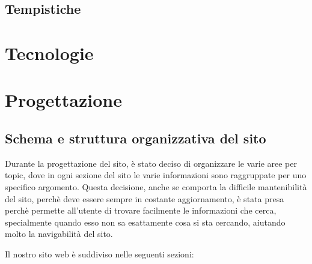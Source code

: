 \documentclass[12pt, a4paper]{article}
\begin{document}
\subsection{Tempistiche}

\pagebreak

\section{Tecnologie}

\pagebreak

\section{Progettazione}

\subsection{Schema e struttura organizzativa del sito}
Durante la progettazione del sito, è stato deciso di organizzare le varie aree per topic, dove in ogni sezione del sito le varie informazioni sono raggruppate
per uno specifico argomento. Questa decisione, anche se comporta la difficile mantenibilità del sito, perchè deve essere sempre in costante aggiornamento, è stata presa perchè permette all'utente
di trovare facilmente le informazioni che cerca, specialmente quando esso non sa esattamente cosa si sta cercando, aiutando molto la navigabilità del sito.\par
Il nostro sito web è suddiviso nelle seguenti sezioni:
\end{document}
